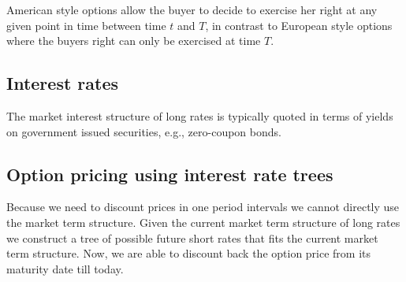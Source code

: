 American style options allow the buyer to decide to exercise
her right at any given point in time between time $t$ and
$T$, in contrast to European style options where the buyers
right can only be exercised at time $T$.


\subsection{Interest rates}

The market interest structure of long rates is typically
quoted in terms of yields on government issued securities,
e.g., zero-coupon bonds.


\subsection{Option pricing using interest rate trees}

Because we need to discount prices in one period intervals
we cannot directly use the market term structure. Given the
current market term structure of long rates we construct a
tree of possible future short rates that fits the current
market term structure. Now, we are able to discount back the
option price from its maturity date till today.
